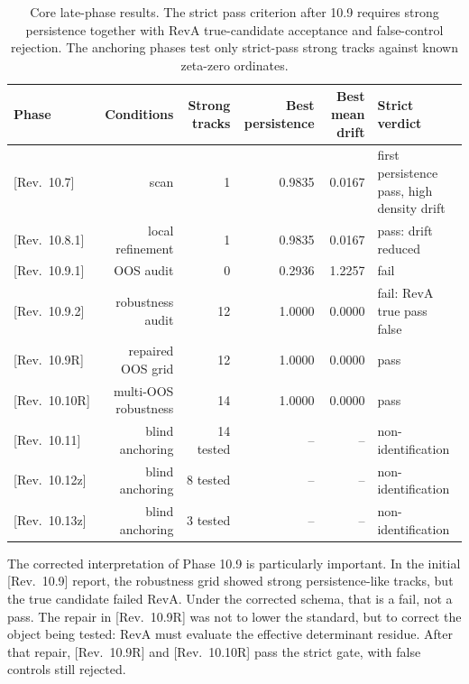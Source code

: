\documentclass[11pt]{article}
\newcommand{\revtag}[1]{\textnormal{[Rev.~#1]}}
\theoremstyle{definition}
\theoremstyle{plain}
\begin{document}
\begin{table}[ht]
\centering
\small
\begin{tabular}{lrrrrl}
\toprule
Phase & Conditions & Strong tracks & Best persistence & Best mean drift & Strict verdict \\
\midrule
\revtag{10.7} & scan & 1 & 0.9835 & 0.0167 & first persistence pass, high density drift \\
\revtag{10.8.1} & local refinement & 1 & 0.9835 & 0.0167 & pass: drift reduced \\
\revtag{10.9.1} & OOS audit & 0 & 0.2936 & 1.2257 & fail \\
\revtag{10.9.2} & robustness audit & 12 & 1.0000 & 0.0000 & fail: RevA true pass false \\
\revtag{10.9R} & repaired OOS grid & 12 & 1.0000 & 0.0000 & pass \\
\revtag{10.10R} & multi-OOS robustness & 14 & 1.0000 & 0.0000 & pass \\
\revtag{10.11} & blind anchoring & 14 tested & -- & -- & non-identification \\
\revtag{10.12z} & blind anchoring & 8 tested & -- & -- & non-identification \\
\revtag{10.13z} & blind anchoring & 3 tested & -- & -- & non-identification \\
\bottomrule
\end{tabular}
\caption{Core late-phase results.  The strict pass criterion after 10.9 requires strong persistence together with RevA true-candidate acceptance and false-control rejection.  The anchoring phases test only strict-pass strong tracks against known zeta-zero ordinates.}
\label{tab:core-results}
\end{table}

The corrected interpretation of Phase 10.9 is particularly important.  In the initial \revtag{10.9} report, the robustness grid showed strong persistence-like tracks, but the true candidate failed RevA.  Under the corrected schema, that is a fail, not a pass.  The repair in \revtag{10.9R} was not to lower the standard, but to correct the object being tested: RevA must evaluate the effective determinant residue.  After that repair, \revtag{10.9R} and \revtag{10.10R} pass the strict gate, with false controls still rejected.
\end{document}

